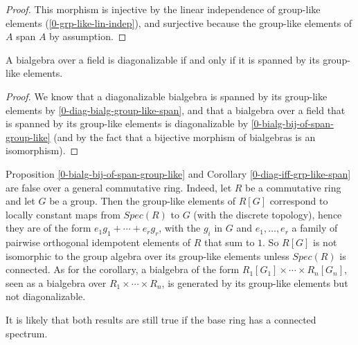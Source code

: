 \begin{proof}
  \leanok   

  This morphism is injective by the linear independence of group-like elements
  (\ref{0-grp-like-lin-indep}), and surjective because the group-like elements
  of $A$ span $A$ by assumption.

\end{proof}
  
\begin{corollary}
  \label{0-bialg-diag-of-span-group-like}
  \leanok 

  A bialgebra over a field is diagonalizable if and only if it is spanned by its
  group-like elements.

\end{corollary}

\begin{proof}
  \leanok 

  We know that a diagonalizable bialgebra is spanned by its group-like elements
  by \ref{0-diag-bialg-group-like-span}, and that a bialgebra over a field
  that is spanned by its group-like elements is diagonalizable by 
  \ref{0-bialg-bij-of-span-group-like} (and by the fact that a bijective morphism
  of bialgebras is an isomorphism).

\end{proof}

  Proposition \ref{0-bialg-bij-of-span-group-like} and Corollary
  \ref{0-diag-iff-grp-like-span} are false over a general
  commutative ring. Indeed, let $R$ be a commutative ring and let $G$ be a group.
  Then the group-like elements of $R[G]$ correspond to locally constant maps
   from $Spec(R)$ to $G$ (with the discrete topology), hence they are of the
  form $e_1 g_1+\cdots+e_r g_r$, with the $g_i$ in $G$ and $e_1,\ldots,e_r$ 
  a family of pairwise orthogonal idempotent elements of $R$ that sum to $1$.
  So $R[G]$ is not isomorphic to the group algebra over its group-like elements
  unless $Spec(R)$ is connected. As for the corollary, a bialgebra of the form
  $R_1[G_1]\times\cdots\times R_n[G_n]$, seen as a bialgebra over
  $R_1\times\cdots\times R_n$, is generated by its group-like elements but not
  diagonalizable.

  It is likely that both results are still true if the base ring has a connected
  spectrum.


